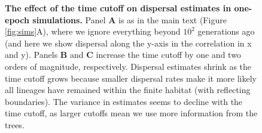 \documentclass[12pt]{article}
\begin{document}
\begin{figure}[!htb]
\begin{center}

\end{center}

\caption{
\textbf{The effect of the time cutoff on dispersal estimates in one-epoch simulations.}
Panel \textbf{A} is as in the main text (Figure \ref{fig:sims}A), where we ignore everything beyond $10^2$ generations ago (and here we show dispersal along the y-axis in the correlation in x and y).
Panels \textbf{B} and \textbf{C} increase the time cutoff by one and two orders of magnitude, respectively.
Dispersal estimates shrink as the time cutoff grows because smaller dispersal rates make it more likely all lineages have remained within the finite habitat (with reflecting boundaries).
The variance in estimates seems to decline with the time cutoff, as larger cutoffs mean we use more information from the trees.
}

\label{fig:sup_sigma_corr_tcut}
\end{figure}


\end{document}
